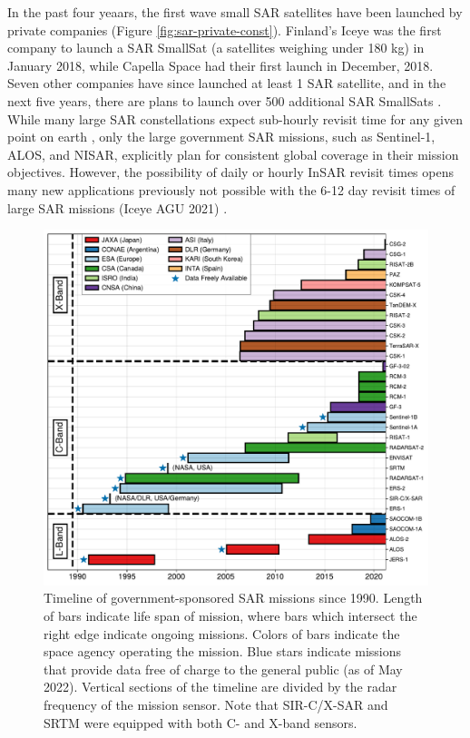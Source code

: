 \documentclass{utexasthesis}
\begin{document}
In the past four yeaars, the first wave small SAR satellites have been launched by private companies (Figure \ref{fig:sar-private-const}). Finland's Iceye was the first company to launch a SAR SmallSat (a satellites weighing under 180 kg) in January 2018, while Capella Space had their first launch in December, 2018. Seven other companies have since launched at least 1 SAR satellite, and in the next five years, there are plans to launch over 500 additional SAR SmallSats \cite{Kulu2021SatelliteConstellations2021}.
While many large SAR constellations expect sub-hourly revisit time for any given point on earth \cite{Stringham2019CapellaXband}, only the large government SAR missions, such as Sentinel-1, ALOS, and NISAR, explicitly plan for consistent global coverage in their mission objectives. However, the possibility of daily or hourly InSAR revisit times opens many new applications previously not possible with the 6-12 day revisit times of large SAR missions  \cite{IceyeAgu2021}(Iceye AGU 2021) \cite{Taylor2021RemoteSensingMountain}.



\begin{figure}[!htbp]
	\centering
	\includegraphics[width=1.1\textwidth]{figures/chapter3-sar/sar-missions.pdf}
	\caption[Timeline of government SAR missions]{Timeline of government-sponsored SAR missions since 1990. Length of bars indicate life span of mission, where bars which intersect the right edge indicate ongoing missions.
	Colors of bars indicate the space agency operating the mission.
	Blue stars indicate missions that provide data free of charge to the general public (as of May 2022).
	Vertical sections of the timeline are divided by the radar frequency of the mission sensor.
    Note that SIR-C/X-SAR and SRTM were equipped with both C- and X-band sensors.}
	\label{fig:sar-missions}
\end{figure}
\end{document}
